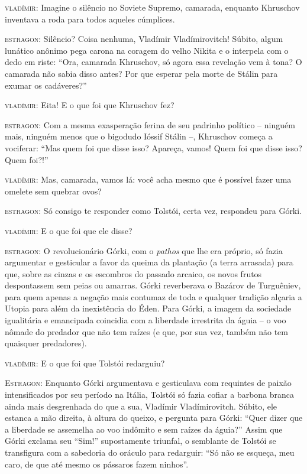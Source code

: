 \textsc{vladímir:} Imagine o silêncio no Soviete Supremo, camarada,
enquanto Khruschov inventava a roda para todos aqueles cúmplices.

\textsc{estragon:} Silêncio? Coisa nenhuma, Vladímir Vladímirovitch!
Súbito, algum lunático anônimo pega carona na coragem do velho Nikita e
o interpela com o dedo em riste: ``Ora, camarada Khruschov, só agora
essa revelação vem à tona? O camarada não sabia disso antes? Por que
esperar pela morte de Stálin para exumar os cadáveres?''

\textsc{vladímir:} Eita! E o que foi que Khruschov fez?

\textsc{estragon:} Com a mesma exasperação ferina de seu padrinho
político -- ninguém mais, ninguém menos que o bigodudo Ióssif Stálin --,
Khruschov começa a vociferar: ``Mas quem foi que disse isso? Apareça,
vamos! Quem foi que disse isso? Quem foi?!''

\textsc{vladímir:} Mas, camarada, vamos lá: você acha mesmo que é
possível fazer uma omelete sem quebrar ovos?

\textsc{estragon:} Só consigo te responder como Tolstói, certa vez,
respondeu para Górki.

\textsc{vladímir:} E o que foi que ele disse?

\textsc{estragon:} O revolucionário Górki, com o \emph{pathos} que lhe
era próprio, só fazia argumentar e gesticular a favor da queima da
plantação (a terra arrasada) para que, sobre as cinzas e os escombros do
passado arcaico, os novos frutos despontassem sem peias ou amarras.
Górki reverberava o Bazárov de Turguêniev, para quem apenas a negação
mais contumaz de toda e qualquer tradição alçaria a Utopia para além da
inexistência do Éden. Para Górki, a imagem da sociedade igualitária e
emancipada coincidia com a liberdade irrestrita da águia -- o voo nômade
do predador que não tem raízes (e que, por sua vez, também não tem
quaisquer predadores).

\textsc{vladímir:} E o que foi que Tolstói redarguiu?

\textsc{Estragon:} Enquanto Górki argumentava e gesticulava com
requintes de paixão intensificados por seu período na Itália, Tolstói só
fazia cofiar a barbona branca ainda mais desgrenhada do que a sua,
Vladímir Vladímirovitch. Súbito, ele estanca a mão direita, à altura do
queixo, e pergunta para Górki: ``Quer dizer que a liberdade se assemelha
ao voo indômito e sem raízes da águia?'' Assim que Górki exclama seu
``Sim!'' supostamente triunfal, o semblante de Tolstói se transfigura
com a sabedoria do oráculo para redarguir: ``Só não se esqueça, meu
caro, de que até mesmo os pássaros fazem ninhos''.

